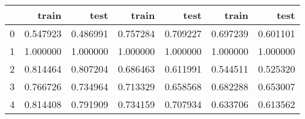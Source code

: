 \begin{tabular}{lrrrrrr}
\toprule
{} &     train &      test &     train &      test &     train &      test \\
\midrule
0 &  0.547923 &  0.486991 &  0.757284 &  0.709227 &  0.697239 &  0.601101 \\
1 &  1.000000 &  1.000000 &  1.000000 &  1.000000 &  1.000000 &  1.000000 \\
2 &  0.814464 &  0.807204 &  0.686463 &  0.611991 &  0.544511 &  0.525320 \\
3 &  0.766726 &  0.734964 &  0.713329 &  0.658568 &  0.682288 &  0.653007 \\
4 &  0.814408 &  0.791909 &  0.734159 &  0.707934 &  0.633706 &  0.613562 \\
\bottomrule
\end{tabular}
